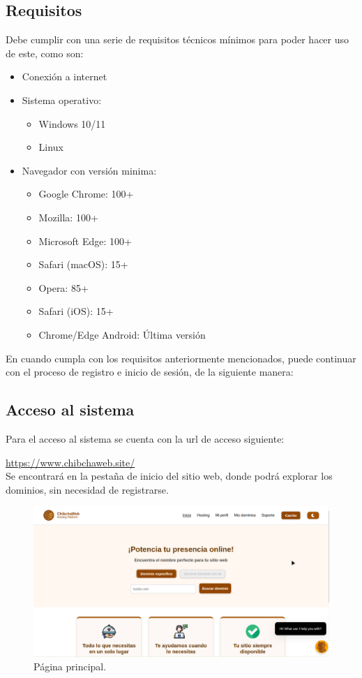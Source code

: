\subsection{Requisitos}
Debe cumplir con una serie de requisitos técnicos mínimos para poder hacer uso de este, como son:

\begin{itemize}
	\item Conexión a internet

\item Sistema operativo:
    \begin{itemize}
        \item Windows 10/11
        \item Linux
    \end{itemize}

\item Navegador con versión minima:
    \begin{itemize}
    \item Google Chrome: 100+
    \item Mozilla: 100+
    \item Microsoft Edge: 100+
    \item Safari (macOS): 15+
    \item Opera: 85+
    \item Safari (iOS): 15+
    \item Chrome/Edge Android: Última versión
    \end{itemize}
\end{itemize}

En cuando cumpla con los requisitos anteriormente mencionados, puede continuar con el proceso de registro e inicio de sesión, de la siguiente manera:

\subsection{Acceso al sistema}

Para el acceso al sistema se cuenta con la url de acceso siguiente:

\url{ https://www.chibchaweb.site/}\\

Se encontrará en la pestaña de inicio del sitio web, donde podrá explorar los dominios, sin necesidad de registrarse.

\begin{figure}[H]
    \centering
	\includegraphics[width=0.8\linewidth]{acceso/inicio.png}
	\caption{Página principal.}
	\label{fig:inicio}
\end{figure}

